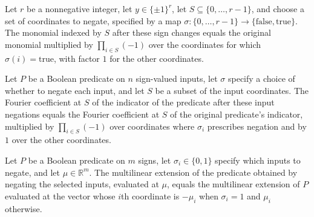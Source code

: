 \begin{theorem}
\label{FABL.monomial_signInputNegationEquiv}
\leanok
{}
Let $r$ be a nonnegative integer, let $y\in\{\pm1\}^r$, let
$S\subseteq\{0,\ldots,r-1\}$, and choose a set of coordinates to negate, specified by a
map $\sigma:\{0,\ldots,r-1\}\to\{\mathrm{false},\mathrm{true}\}$. The monomial indexed
by $S$ after these sign changes equals the original monomial multiplied by $\prod_{i\in
S}(-1)$ over the coordinates for which $\sigma(i)=\mathrm{true}$, with factor $1$ for
the other coordinates.
\end{theorem}

\begin{theorem}
\label{FABL.fourierCoeff_indicator_negateInputs}
\leanok
{}
Let $P$ be a Boolean predicate on $n$ sign-valued inputs, let $\sigma$ specify a choice
of whether to negate each input, and let $S$ be a subset of the input coordinates. The
Fourier coefficient at $S$ of the indicator of the predicate after these input negations
equals the Fourier coefficient at $S$ of the original predicate's indicator, multiplied
by $\prod_{i\in S}(-1)$ over coordinates where $\sigma_i$ prescribes negation and by $1$
over the other coordinates.
\end{theorem}

\begin{theorem}
\label{FABL.SignPredicate.multilinearExtension_negateInputs}
\leanok
{}
Let $P$ be a Boolean predicate on $m$ signs, let $\sigma_i\in\{0,1\}$ specify which
inputs to negate, and let $\mu\in\mathbb R^m$. The multilinear extension of the
predicate obtained by negating the selected inputs, evaluated at $\mu$, equals the
multilinear extension of $P$ evaluated at the vector whose $i$th coordinate is $-\mu_i$
when $\sigma_i=1$ and $\mu_i$ otherwise.
\end{theorem}

